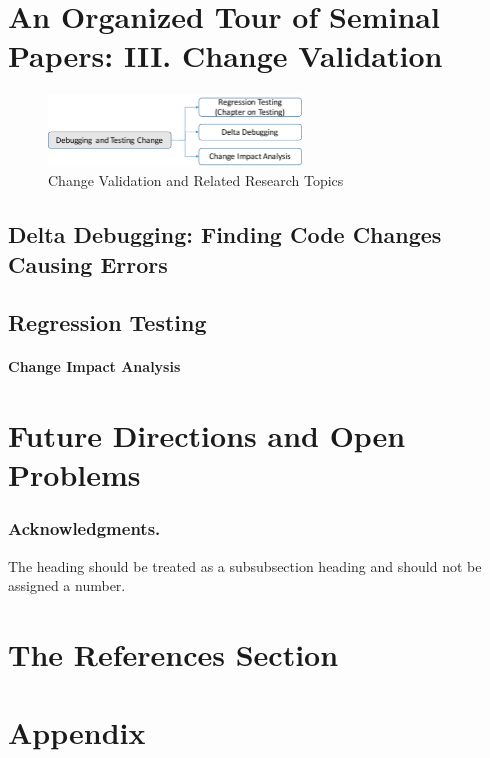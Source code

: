 \documentclass[runningheads,a4paper]{llncs}
\begin{document}
\section{An Organized Tour of Seminal Papers: III. Change Validation} 
\label{sec:debugtest}

\begin{figure}[ht]
 \centering
 \includegraphics[width=0.6\textwidth]{images/ChangeValidation.pdf} 
 \caption{Change Validation and Related Research Topics} 
 \label{fig:changevalidation} 
\end{figure}



\subsection{Delta Debugging: Finding Code Changes Causing Errors}
\subsection{Regression Testing} 
\paragraph{Change Impact Analysis} 

\section{Future Directions and Open Problems} 


\subsubsection*{Acknowledgments.} The heading should be treated as a
subsubsection heading and should not be assigned a number.

\section{The References Section}\label{references}



\section*{Appendix} 
\end{document}
